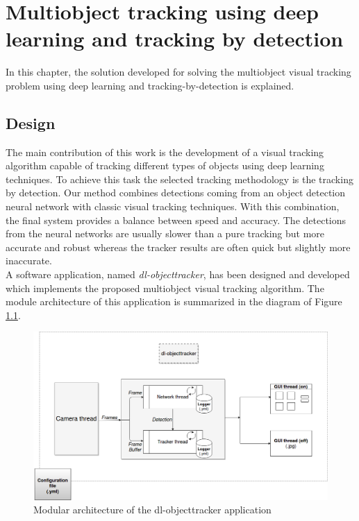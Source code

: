 \chapter{Multiobject tracking using deep learning and tracking by detection}
In this chapter, the solution developed for solving the multiobject visual tracking problem using deep learning and tracking-by-detection is explained.

\section{Design}
The main contribution of this work is the development of a visual tracking algorithm capable of tracking different types of objects using deep learning techniques. To achieve this task the selected tracking methodology is the tracking by detection. Our method combines detections coming from an object detection neural network with classic visual tracking techniques. With this combination, the final system provides a balance between speed and accuracy. The detections from the neural networks are usually slower than a pure tracking but more accurate and robust whereas the tracker results are often quick but slightly more inaccurate.\\
A software application, named \textit{dl-objecttracker}, has been designed and developed which implements the proposed multiobject visual tracking algorithm. The module architecture of this application is summarized in the diagram of Figure \ref{fig:general}.
\begin{figure}[H]
\begin{center}
\includegraphics[scale=0.4]{figures/general.png}
\caption{Modular architecture of the dl-objecttracker application}
\label{fig:general}
\end{center}
\end{figure}

